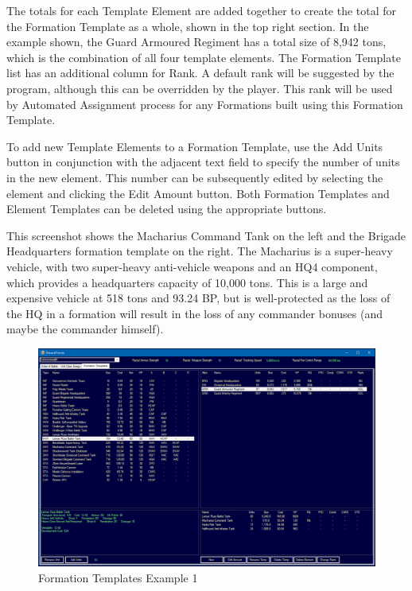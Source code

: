 \documentclass[../../Aurora C# unofficial manual.tex]{subfiles}
\begin{document}
	The totals for each Template Element are added together to create the total for the Formation Template as a whole, shown in the top right section. In the example shown, the Guard Armoured Regiment has a total size of 8,942 tons, which is the combination of all four template elements. The Formation Template list has an additional column for Rank. A default rank will be suggested by the program, although this can be overridden by the player. This rank will be used by Automated Assignment process for any Formations built using this Formation Template.
	
	To add new Template Elements to a Formation Template, use the Add Units button in conjunction with the adjacent text field to specify the number of units in the new element. This number can be subsequently edited by selecting the element and clicking the Edit Amount button. Both Formation Templates and Element Templates can be deleted using the appropriate buttons.
	
	This screenshot shows the Macharius Command Tank on the left and the Brigade Headquarters formation template on the right. The Macharius is a super-heavy vehicle, with two super-heavy anti-vehicle weapons and an HQ4 component, which provides a headquarters capacity of 10,000 tons. This is a large and expensive vehicle at 518 tons and 93.24 BP, but is well-protected as the loss of the HQ in a formation will result in the loss of any commander bonuses (and maybe the commander himself).
	\begin{figure}[H]
		\centering
		\includegraphics[width=0.95\linewidth]{images/FormationTemplates}
		\caption[Formation Templates]{Formation Templates Example 1}
		\label{fig:formationtemplates}
	\end{figure}
	
\end{document}
